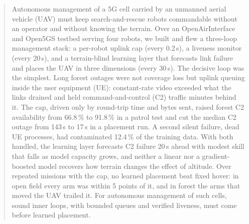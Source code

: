 \begin{abstract}
Autonomous management of a 5G cell carried by an unmanned aerial vehicle (UAV)
must keep search-and-rescue robots commandable without an operator and without
knowing the terrain. Over an OpenAirInterface and Open5GS testbed serving four
robots, we built and flew a three-loop management stack: a per-robot uplink cap
(every 0.2\,s), a liveness monitor (every 20\,s), and a terrain-blind learning
layer that forecasts link failure and places the UAV in three dimensions (every
30\,s). The decisive loop was the simplest. Long forest outages were not
coverage loss but uplink queuing inside the user equipment (UE): constant-rate
video exceeded what the links drained and held command-and-control (C2) traffic
minutes behind it. The cap, driven only by round-trip time and bytes sent,
raised forest C2 availability from 66.8\,\% to 91.8\,\% in a patrol test and
cut the median C2 outage from 143\,s to 17\,s in a placement run. A second
silent failure, dead UE processes, had contaminated 12.4\,\% of the training
data. With both handled, the learning layer forecasts C2 failure 20\,s ahead
with modest skill that falls as model capacity grows, and neither a linear nor
a gradient-boosted model recovers how terrain changes the effect of altitude.
Over repeated missions with the cap, no learned placement beat fixed hover:
in open field every arm was within 5 points of it, and in forest the arms that
moved the UAV trailed it. For autonomous management
of such cells, sound inner loops, with bounded queues and verified liveness,
must come before learned placement.
\end{abstract}
